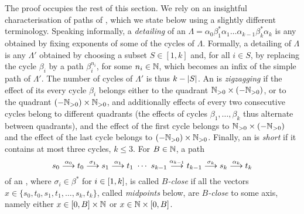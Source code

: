 

\begin{appendixproof}
The proof occupies the rest of this section.
We rely on an insightful characterisation of paths of \slps \cite[Theorem 4.16]{DBLP:conf/focs/0001CMOSW24},
which we state below using a slightly different terminology.
%
Speaking informally, a \emph{detailing} of an \slps 
$\Lambda = \alpha_0 \beta_1^* \alpha_1 \ldots \alpha_{k-1} \beta_k^* \alpha_k$
is any \slps obtained by fixing exponents of some of the cycles of $\Lambda$.
Formally, a detailing of $\Lambda$ is any $\Lambda'$ obtained by choosing a subset $S \in [1,k]$ and,
for all $i \in S$, by replacing the cycle $\beta_i$ by a path $\beta_i^{n_i}$, for some $n_i\in\mathbb{N}$, 
which becomes an infix of the simple path of $\Lambda'$.
The number of cycles of $\Lambda'$ is thus $k-\left|S\right|$.
%
An \dslps is \emph{zigzagging} if the effect of its every cycle $\beta_i$ 
belongs either to the quadrant $\mathbb{N}_{>0} \times (-\mathbb{N}_{>0})$,
or to the quadrant $(-\mathbb{N}_{>0}) \times \mathbb{N}_{>0}$, and additionally effects of every two consecutive cycles belong 
to different quadrants
(the effects of cycles $\beta_1, \ldots, \beta_k$ thus alternate between quadrants), and the effect of the first cycle belongs to $\mathbb{N}_{>0} \times (-\mathbb{N}_{>0})$ and the effect of the last cycle belongs to $(-\mathbb{N}_{>0}) \times \mathbb{N}_{>0}$.
Finally, an \slps is \emph{short} if it contains at most three cycles, $k\leq 3$.
For $B\in\mathbb{N}$,
a path 
\[
s_0 \stackrel{\alpha_0}{\longrightarrow} t_0 \stackrel{\sigma_1}{\longrightarrow} s_1 \stackrel{\alpha_1}{\longrightarrow} t_1 \ \cdots \ s_{k-1} \stackrel{\alpha_{k-1}}{\longrightarrow} t_{k-1} \stackrel{\sigma_{k}}{\longrightarrow} s_k \stackrel{\alpha_k}{\longrightarrow} t_k
\]
of an \dslps,
where $\sigma_i \in\beta^*$ for $i\in[1, k]$, is called \emph{$B$-close} if all the vectors $x\in \{s_0, t_0, s_1, t_1, \ldots, s_k, t_k\}$,
called \emph{midpoints} below,
are \emph{$B$-close} to some axis, namely either $x\in [0, B] \times \mathbb{N}$ or 
$x\in \mathbb{N}\times[0, B]$.


\end{appendixproof}
